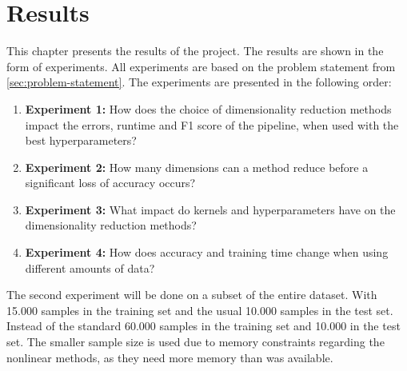 \chapter{Results}\label{cha:results}
This chapter presents the results of the project. The results are shown in the form of experiments. All experiments are based on the problem statement from \autoref{sec:problem-statement}. The experiments are presented in the following order:


\begin{enumerate}
    \item \textbf{Experiment 1:} How does the choice of dimensionality reduction methods impact the errors, runtime and F1 score of the pipeline, when used with the best hyperparameters?
    \item \textbf{Experiment 2:} How many dimensions can a method reduce before a significant loss of accuracy occurs?
    \item \textbf{Experiment 3:} What impact do kernels and hyperparameters have on the dimensionality reduction methods?
    \item \textbf{Experiment 4:} How does accuracy and training time change when using different amounts of data?
\end{enumerate}



The second experiment will be done on a subset of the entire dataset. With 15.000 samples in the training set and the usual 10.000 samples in the test set. Instead of the standard 60.000 samples in the training set and 10.000 in the test set. The smaller sample size is used due to memory constraints regarding the nonlinear methods, as they need more memory than was available.





